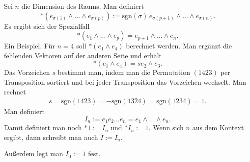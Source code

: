 \documentclass[a4paper,10pt,fleqn,twocolumn,twoside]{article}
\begin{document}
Sei $n$ die Dimension des Raums. Man definiert
\[*(e_{\sigma(1)}\wedge\ldots\wedge e_{\sigma(p)})
:= \mathrm{sgn}(\sigma)\,e_{\sigma(p+1)}\wedge\ldots\wedge e_{\sigma(n)}.\]
Es ergibt sich der Spezialfall
\[*(e_1\wedge\ldots\wedge e_p) = e_{p+1}\wedge\ldots\wedge e_n.\]
Ein Beispiel. Für $n=4$ soll $*(e_1\wedge e_4)$
berechnet werden. Man ergänzt die fehlenden Vektoren
auf der anderen Seite und erhält
\[*(e_1\wedge e_4) = se_2\wedge e_3.\]
Das Vorzeichen $s$ bestimmt man, indem man die Permutation
$(1423)$ per Transposition sortiert und bei jeder Transposition
das Vorzeichen wechselt. Man rechnet
\begin{gather*}
s = \mathrm{sgn}(1423)=-\mathrm{sgn}(1324) = \mathrm{sgn}(1234) = 1.
\end{gather*}
Man definiert
\[I_n := e_1e_2\ldots e_n = e_1\wedge\ldots\wedge e_n.\]
Damit definiert man noch $*1:=I_n$ und $*I_n:=1$.
Wenn sich $n$ aus dem Kontext ergibt, dann schreibt man auch $I:=I_n$.

Außerdem legt man $I_0:=1$ fest.
\end{document}
